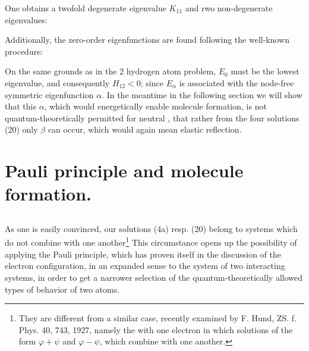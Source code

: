 \begin{paper}{1}
One obtains a twofold degenerate eigenvalue $K_{11}$ and rwo non-degenerate eigenvalues:

Additionally, the zero-order eigenfunctions are found following the well-known procedure:

On the same grounds as in the 2 hydrogen atom problem, $E_0$ must be the lowest eigenvalue, and consequently $H_{12}<0$; since $E_\alpha$ is associated with the node-free symmetric eigenfunction $\alpha$. In the meantime in the following section we will show that this $\alpha$, which would energetically enable molecule formation, is not quantum-theoretically permitted for neutral , that rather from the four solutions (20) only $\beta$ can occur, which would again mean elastic reflection.

\section{Pauli principle and molecule formation.} \subsection{} As one is easily convinced, our solutions (4a) resp. (20) belong to systems which do not combine with one another\footnote{They are different from a similar case, recently examined by F. Hund, ZS. f. Phys. 40, 743, 1927, namely the  with one electron in which solutions of the form $\varphi+\psi$ and $\varphi-\psi$, which combine with one another.} This circumstance opens up the possibility of applying the Pauli principle, which has proven itself in the  discussion of the electron configuration, in an expanded sense to the system of two interacting systems, in order to get a narrower selection of the quantum-theoretically allowed types of behavior of two atoms.


\end{paper}
